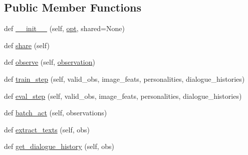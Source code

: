 \subsection*{Public Member Functions}
\begin{DoxyCompactItemize}
\item 
def \hyperlink{classprojects_1_1image__chat_1_1transresnet__multimodal_1_1transresnet__multimodal_1_1TransresnetMultimodalAgent_aeb8b0b2c932460122db8e86c155c3fa4}{\+\_\+\+\_\+init\+\_\+\+\_\+} (self, \hyperlink{classprojects_1_1personality__captions_1_1transresnet_1_1transresnet_1_1TransresnetAgent_a4a66af4ad244944bef1de1010d4f2c1e}{opt}, shared=None)
\item 
def \hyperlink{classprojects_1_1image__chat_1_1transresnet__multimodal_1_1transresnet__multimodal_1_1TransresnetMultimodalAgent_a645c89d60d3358862f86d192f92a2313}{share} (self)
\item 
def \hyperlink{classprojects_1_1image__chat_1_1transresnet__multimodal_1_1transresnet__multimodal_1_1TransresnetMultimodalAgent_a8bb118477544ab35e45194dc1f08f4ce}{observe} (self, \hyperlink{classprojects_1_1image__chat_1_1transresnet__multimodal_1_1transresnet__multimodal_1_1TransresnetMultimodalAgent_ac52daf43de7ffecd6e1e658e8b472ed6}{observation})
\item 
def \hyperlink{classprojects_1_1image__chat_1_1transresnet__multimodal_1_1transresnet__multimodal_1_1TransresnetMultimodalAgent_a5836026083146df8a7b4ed354ecf1070}{train\+\_\+step} (self, valid\+\_\+obs, image\+\_\+feats, personalities, dialogue\+\_\+histories)
\item 
def \hyperlink{classprojects_1_1image__chat_1_1transresnet__multimodal_1_1transresnet__multimodal_1_1TransresnetMultimodalAgent_a8f934968183ae14794bcec65abaef624}{eval\+\_\+step} (self, valid\+\_\+obs, image\+\_\+feats, personalities, dialogue\+\_\+histories)
\item 
def \hyperlink{classprojects_1_1image__chat_1_1transresnet__multimodal_1_1transresnet__multimodal_1_1TransresnetMultimodalAgent_a446c248cfc8d115d4944fcddb3bd05cf}{batch\+\_\+act} (self, observations)
\item 
def \hyperlink{classprojects_1_1image__chat_1_1transresnet__multimodal_1_1transresnet__multimodal_1_1TransresnetMultimodalAgent_ac6efbef147b54cd3e5129b86df095687}{extract\+\_\+texts} (self, obs)
\item 
def \hyperlink{classprojects_1_1image__chat_1_1transresnet__multimodal_1_1transresnet__multimodal_1_1TransresnetMultimodalAgent_a20dffaa1e8baf3dcaae7601946fa5724}{get\+\_\+dialogue\+\_\+history} (self, obs)

\end{DoxyCompactItemize}
